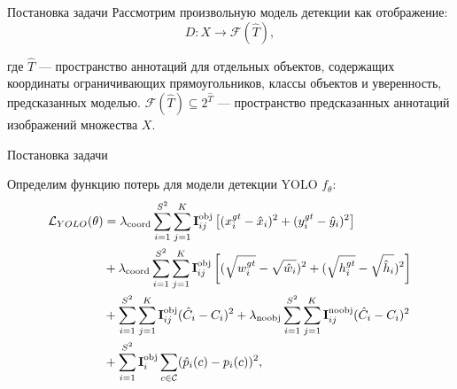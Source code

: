 \documentclass{beamer}
\begin{document}
\begin{frame}{Постановка задачи}
Рассмотрим произвольную модель детекции как отображение:
\[
D: X \to \mathcal{F}(\hat{T}),
\]

где $\hat{T}$ — пространство аннотаций для отдельных объектов, содержащих координаты ограничивающих прямоугольников, классы объектов и уверенность, предсказанных моделью. $\mathcal{F}(\hat{T}) \subseteq 2^{\hat{T}}$ — пространство предсказанных аннотаций изображений множества $X$.
\end{frame}

\begin{frame}{Постановка задачи}


Определим функцию потерь для модели детекции YOLO $f_{\theta}$:
\begin{align*}
\mathcal{L}_{YOLO}(\theta) &= \lambda_{\text{coord}} \sum_{i=1}^{S^2} \sum_{j=1}^{K} \textbf{I}_{ij}^{\text{obj}} 
\left[ (x^{gt}_i - \hat{x}_i)^2 + (y^{gt}_i - \hat{y}_i)^2 \right] \notag \\
&+ \lambda_{\text{coord}} \sum_{i=1}^{S^2} \sum_{j=1}^{K} \textbf{I}_{ij}^{\text{obj}} 
\left[ (\sqrt{w^{gt}_i} - \sqrt{\hat{w}_i})^2 + (\sqrt{h^{gt}_i} - \sqrt{\hat{h}_i})^2 \right] \notag \\
&+ \sum_{i=1}^{S^2} \sum_{j=1}^{K} \textbf{I}_{ij}^{\text{obj}} (\hat{C}_i - C_i)^2 
+ \lambda_{\text{noobj}} \sum_{i=1}^{S^2} \sum_{j=1}^{K} \textbf{I}_{ij}^{\text{noobj}} (\hat{C}_i - C_i)^2 \notag \\
&+ \sum_{i=1}^{S^2} \textbf{I}_{i}^{\text{obj}} \sum_{c \in \mathcal{C}} (\hat{p}_i(c) - p_i(c))^2,
\end{align*}

\end{frame}
\end{document}
